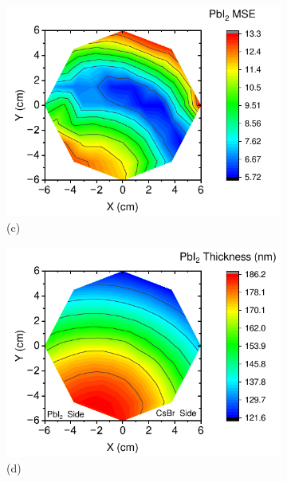 \begin{figure}[htbp]
    \begin{subfigure}[t]{0.49\textwidth}
        \centering
        \includegraphics[width=\textwidth]{chapters/stability/imeges/PbI2MSE.pdf} %
        \caption*{(c)}
    \end{subfigure}
    \hfill
    \begin{subfigure}[t]{0.49\textwidth}
        \centering
        \includegraphics[width=\textwidth]{chapters/stability/imeges/PbI2Thickness.pdf} %
        \caption*{(d)}
    \end{subfigure}
    \caption{}
    \label{fig:stability:ellipsometry:thickness_mse}
\end{figure}

